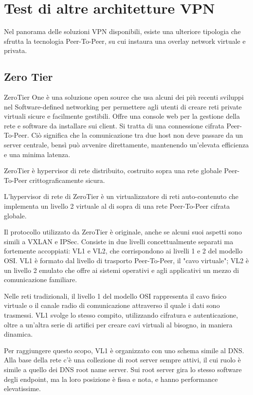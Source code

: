 \section{Test di altre architetture VPN}
Nel panorama delle soluzioni VPN disponibili, esiste una ulteriore tipologia che sfrutta la tecnologia Peer-To-Peer, su cui instaura una overlay network virtuale e privata.

\subsection{Zero Tier}
ZeroTier One \cite{ZeroTier} è una soluzione open source che usa alcuni dei più recenti sviluppi nel Software-defined networking per permettere agli utenti di creare reti private virtuali sicure e facilmente gestibili. Offre una console web per la gestione della rete e software da installare sui client.
Si tratta di una connessione cifrata Peer-To-Peer. Ciò significa che la comunicazione tra due host non deve passare da un server centrale, bensì può avvenire direttamente, mantenendo un'elevata efficienza e una minima latenza.

ZeroTier è hypervisor di rete distribuito, costruito sopra una rete globale Peer-To-Peer crittograficamente sicura.

L'hypervisor di rete di ZeroTier è un virtualizzatore di reti auto-contenuto che implementa un livello 2 virtuale al di sopra di una rete Peer-To-Peer cifrata globale.

Il protocollo utilizzato da ZeroTier è originale, anche se alcuni suoi aspetti sono simili a VXLAN e IPSec. Consiste in due livelli concettualmente separati ma fortemente accoppiati: VL1 e VL2, che corrispondono ai livelli 1 e 2 del modello OSI. VL1 è formato dal livello di trasporto Peer-To-Peer, il "cavo virtuale"; VL2 è un livello 2 emulato che offre ai sistemi operativi e agli applicativi un mezzo di comunicazione familiare.

Nelle reti tradizionali, il livello 1 del modello OSI rappresenta il cavo fisico virtuale o il canale radio di comunicazione attraverso il quale i dati sono trasmessi. VL1 svolge lo stesso compito, utilizzando cifratura e autenticazione, oltre a un'altra serie di artifici per creare cavi virtuali al bisogno, in maniera dinamica.

Per raggiungere questo scopo, VL1 è organizzato con uno schema simile al DNS. Alla base della rete c'è una collezione di root server sempre attivi, il cui ruolo è simile a quello dei DNS root name server. Sui root server gira lo stesso software degli endpoint, ma la loro posizione è fissa e nota, e hanno performance elevatissime.


